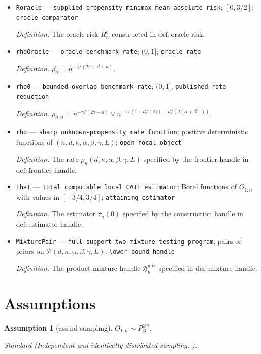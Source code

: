 \documentclass{article}
\newtheorem{assumption}{Assumption}
\begin{document}
\begin{itemize}
  \item \texttt{Roracle} --- \texttt{supplied-\allowbreak{}propensity minimax mean-\allowbreak{}absolute risk}; \([0,3/2]\); \texttt{oracle comparator}
  \par\smallskip\noindent\emph{Definition.} The oracle risk \(R_n^{e}\) constructed in \(\mathrm{def:oracle\mbox{-}risk}\).
  \item \texttt{rhoOracle} --- \texttt{oracle benchmark rate}; \((0,1]\); \texttt{oracle rate}
  \par\smallskip\noindent\emph{Definition.} \(\rho_n^{e}=n^{-\gamma/(2\gamma+d+\kappa)}\).
  \item \texttt{rho0} --- \texttt{bounded-\allowbreak{}overlap benchmark rate}; \((0,1]\); \texttt{published-\allowbreak{}rate reduction}
  \par\smallskip\noindent\emph{Definition.} \(\rho_{n,0}=n^{-\gamma/(2\gamma+d)}\vee n^{-1/(1+d/(2\gamma)+d/(2(\alpha+\beta)))}\).
  \item \texttt{rho} --- \texttt{sharp unknown-\allowbreak{}propensity rate function}; positive deterministic functions of \((n,d,\kappa,\alpha,\beta,\gamma,L)\); \texttt{open focal object}
  \par\smallskip\noindent\emph{Definition.} The rate \(\rho_n(d,\kappa,\alpha,\beta,\gamma,L)\) specified by the frontier handle in \(\mathrm{def:frontier\mbox{-}handle}\).
  \item \texttt{That} --- \texttt{total computable local CATE estimator}; Borel functions of \(O_{1:n}\) with values in \([-3/4,3/4]\); \texttt{attaining estimator}
  \par\smallskip\noindent\emph{Definition.} The estimator \(\widehat\tau_n(0)\) specified by the construction handle in \(\mathrm{def:estimator\mbox{-}handle}\).
  \item \texttt{MixturePair} --- \texttt{full-\allowbreak{}support two-\allowbreak{}mixture testing program}; pairs of priors on \(\mathcal P(d,\kappa,\alpha,\beta,\gamma,L)\); \texttt{lower-\allowbreak{}bound handle}
  \par\smallskip\noindent\emph{Definition.} The product-mixture handle \(\mathfrak H_n^{\mathrm{mix}}\) specified in \(\mathrm{def:mixture\mbox{-}handle}\).
\end{itemize}

\section{Assumptions}

\begin{assumption}[ass:iid-sampling]\label{ass:iid-sampling}
\(O_{1:n}\sim P_O^{\otimes n}\).
\par\smallskip\noindent\emph{Standard} (Independent and identically distributed sampling, \cite{KennedyBalakrishnanRobinsWasserman2024MinimaxCATE}).
\end{assumption}
\end{document}
